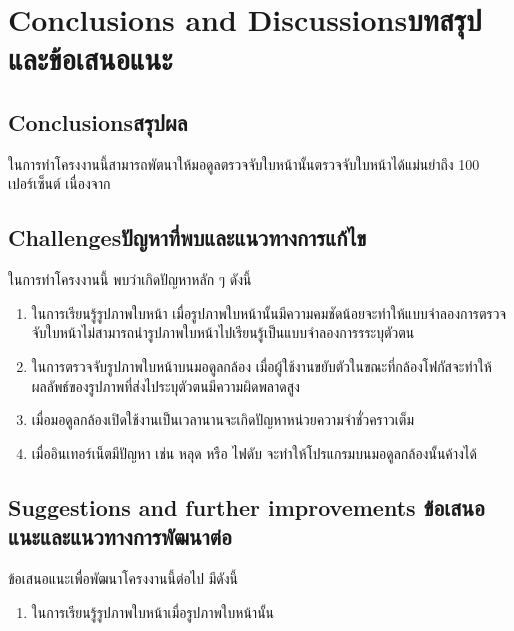 \chapter{\ifenglish Conclusions and Discussions\else บทสรุปและข้อเสนอแนะ\fi}

\section{\ifenglish Conclusions\else สรุปผล\fi}

ในการทำโครงงานนี้สามารถพัตนาให้มอดูลตรวจจับใบหน้านั้นตรวจจับใบหน้าได้แม่นยำถึง 100 เปอร์เซ็นต์ เนื่องจาก


\section{\ifenglish Challenges\else ปัญหาที่พบและแนวทางการแก้ไข\fi}

ในการทำโครงงานนี้ พบว่าเกิดปัญหาหลัก ๆ ดังนี้
\begin{enumerate}
    \item ในการเรียนรู้รูปภาพใบหน้า เมื่อรูปภาพใบหน้านั้นมีความคมชัดน้อยจะทำให้แบบจำลองการตรวจจับใบหน้าไม่สามารถนำรูปภาพใบหน้าไปเรียนรู้เป็นแบบจำลองการรระบุตัวตน
    \item ในการตรวจจับรูปภาพใบหน้าบนมอดูลกล้อง เมื่อผู้ใช้งานขยับตัวในขณะที่กล้องโฟกัสจะทำให้ผลลัพธ์ของรูปภาพที่ส่งไประบุตัวตนมีความผิดพลาดสูง
    \item เมื่อมอดูลกล้องเปิดใช้งานเป็นเวลานานจะเกิดปัญหาหน่วยความจำชั่วคราวเต็ม
    \item เมื่ออินเทอร์เน็ตมีปัญหา เช่น หลุด หรือ ไฟดับ จะทำให้โปรแกรมบนมอดูลกล้องนั้นค้างได้
\end{enumerate}



\section{\ifenglish%
Suggestions and further improvements
\else%
ข้อเสนอแนะและแนวทางการพัฒนาต่อ
\fi
}

ข้อเสนอแนะเพื่อพัฒนาโครงงานนี้ต่อไป มีดังนี้
\begin{enumerate}
    \item ในการเรียนรู้รูปภาพใบหน้าเมื่อรูปภาพใบหน้านั้น
\end{enumerate}
